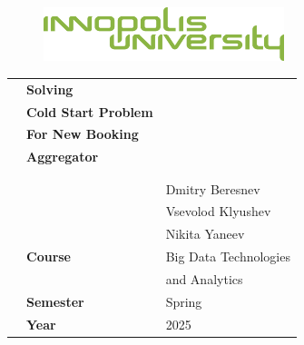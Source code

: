 \begin{center}

  \vspace*{1cm}

  \begin{figure}
    \raggedleft
    \begin{minipage}{5cm}
      \includegraphics[width=7cm]{images/logo.png}
    \end{minipage}
  \end{figure}

  \vspace*{2cm}

  \vspace*{0.1in}

  \begin{spacing}{1.7}

    \begin{tabular}{p{3cm} l l}

       & \textbf{\huge Solving}                                                   \\ %
       & \textbf{\huge Cold Start Problem}                                        \\
       & \textbf{\huge For New Booking}                                           \\
       & \textbf{\huge Aggregator}                                                \\
       &                                                                          \\
       &                                                                          \\
       & \large \multirow{3}{*}{\textbf{Students}} & \large Dmitry Beresnev       \\
       &                                           & \large Vsevolod Klyushev     \\
       &                                           & \large Nikita Yaneev         \\
       & \large \textbf{Course}                    & \large Big Data Technologies \\
       & \large \textbf{}                          & \large and Analytics         \\
       & \large \textbf{Semester}                  & \large Spring                \\
       & \large \textbf{Year}                      & \large 2025                  \\
    \end{tabular}


\end{spacing}
\end{center}
